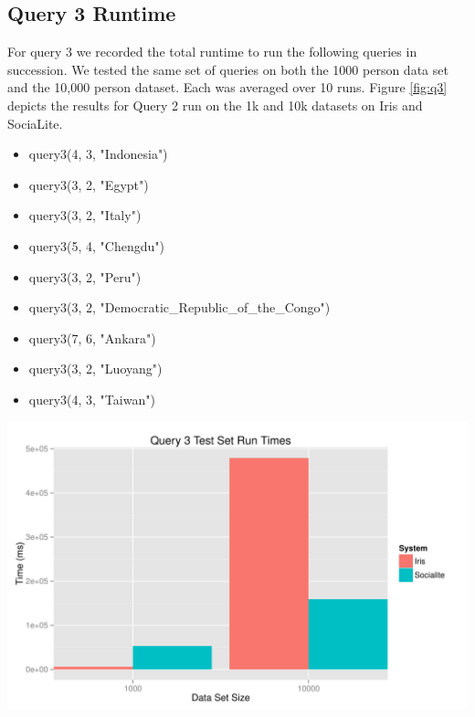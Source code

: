 \documentclass{article}
\begin{document}
\begin{multicols}{2}
\subsection {Query 3 Runtime}

For query 3 we recorded the total runtime to run the following queries in succession. We tested the same set of queries on both the 1000 person data set and the 10,000 person dataset. Each was averaged over 10 runs. Figure \ref{fig:q3} depicts the results for Query 2 run on the 1k and 10k datasets on Iris and SociaLite. 
\begin{itemize}
\item query3(4, 3, "Indonesia")
\item query3(3, 2, "Egypt")
\item query3(3, 2, "Italy")
\item query3(5, 4, "Chengdu")
\item query3(3, 2, "Peru")
\item query3(3, 2, "Democratic\_Republic\_of\_the\_Congo")
\item query3(7, 6, "Ankara")
\item query3(3, 2, "Luoyang")
\item query3(4, 3, "Taiwan")
\end{itemize}
			

\begingroup
    \centering
    \includegraphics[scale=0.4]{../results/query3.pdf}
    \label{fig:q3}
\endgroup


\end{multicols}
\end{document}
